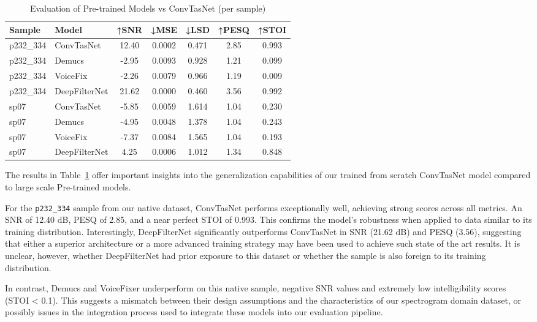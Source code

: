 \vspace{1em}
\begin{table}[H]
\centering
\caption{Evaluation of Pre-trained Models vs ConvTasNet (per sample)}
\label{tab:pretrained_eval}
\begin{tabular}{|l|l|c|c|c|c|c|}
\hline
\textbf{Sample} & \textbf{Model} & \textbf{↑SNR} & \textbf{↓MSE} & \textbf{↓LSD} & \textbf{↑PESQ} & \textbf{↑STOI} \\
\hline
p232\_334 & ConvTasNet      & 12.40 & 0.0002 & 0.471 & 2.85 & 0.993 \\
p232\_334 & Demucs          & -2.95 & 0.0093 & 0.928 & 1.21 & 0.099 \\
p232\_334 & VoiceFix        & -2.26 & 0.0079 & 0.966 & 1.19 & 0.009 \\
p232\_334 & DeepFilterNet   & 21.62 & 0.0000 & 0.460 & 3.56 & 0.992 \\
\hline
sp07      & ConvTasNet      & -5.85 & 0.0059 & 1.614 & 1.04 & 0.230 \\
sp07      & Demucs          & -4.95 & 0.0048 & 1.378 & 1.04 & 0.243 \\
sp07      & VoiceFix        & -7.37 & 0.0084 & 1.565 & 1.04 & 0.193 \\
sp07      & DeepFilterNet   & 4.25  & 0.0006 & 1.012 & 1.34 & 0.848 \\
\hline
\end{tabular}
\end{table}


The results in Table~\ref{tab:pretrained_eval} offer important insights into the generalization capabilities of our trained from scratch ConvTasNet model compared to large scale Pre-trained models.

For the \texttt{p232\_334} sample from our native dataset, ConvTasNet performs exceptionally well, achieving strong scores across all metrics. An SNR of 12.40 dB, PESQ of 2.85, and a near perfect STOI of 0.993. This confirms the model’s robustness when applied to data similar to its training distribution. Interestingly, DeepFilterNet significantly outperforms ConvTasNet in SNR (21.62 dB) and PESQ (3.56), suggesting that either a superior architecture or a more advanced training strategy may have been used to achieve such state of the art results. It is unclear, however, whether DeepFilterNet had prior exposure to this dataset or whether the sample is also foreign to its training distribution.

In contrast, Demucs and VoiceFixer underperform on this native sample, negative SNR values and extremely low intelligibility scores (STOI < 0.1). This suggests a mismatch between their design assumptions and the characteristics of our spectrogram domain dataset, or possibly issues in the integration process used to integrate these models into our evaluation pipeline.

